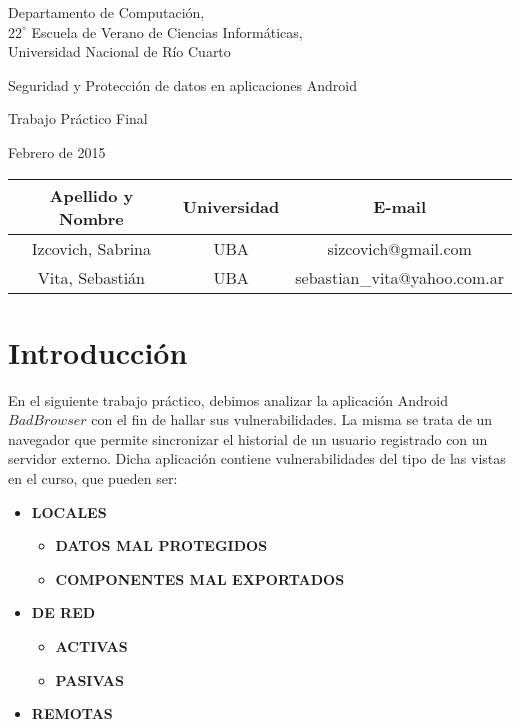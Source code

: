 \documentclass[10pt, a4paper]{article}
\author{Seguridad Android.}
\date{}								%
\begin{document}
\thispagestyle{empty}

\begin{center}

\vspace{2cm}

Departamento de Computación,\\
$22^{\circ}$ Escuela de Verano de Ciencias Informáticas,\\
Universidad Nacional de Río Cuarto

\vspace{4cm}

\begin{Huge}
Seguridad y Protección de datos en aplicaciones Android\end{Huge}

\vspace{0.5cm}

\begin{huge}
Trabajo Práctico Final
\end{huge}

\vspace{1cm}

Febrero de 2015

\vspace{8cm}


\vspace{1cm}

\begin{tabular}{|c|c|c|}
\hline
Apellido y Nombre & Universidad & E-mail\\
\hline
Izcovich, Sabrina     & UBA & sizcovich@gmail.com\\
Vita, Sebastián       & UBA & sebastian\_vita@yahoo.com.ar\\
\hline
\end{tabular}

\end{center}

\newpage
\tableofcontents
\newpage

\section{Introducción}
En el siguiente trabajo práctico, debimos analizar la aplicación Android $BadBrowser$ con el fin de hallar sus vulnerabilidades. La misma se trata de un navegador que permite sincronizar el historial de un usuario registrado con un servidor externo. Dicha aplicación contiene vulnerabilidades del tipo de las vistas en el curso, que pueden ser:
\begin{itemize}
\item \textbf{LOCALES}
\begin{itemize}
\item \textbf{DATOS MAL PROTEGIDOS}
\item \textbf{COMPONENTES MAL EXPORTADOS}
\end{itemize}
\item \textbf{DE RED}
\begin{itemize}
\item \textbf{ACTIVAS}
\item \textbf{PASIVAS}
\end{itemize}
\item \textbf{REMOTAS}
\end{itemize}
\end{document}
